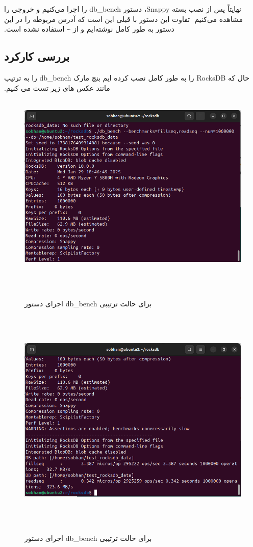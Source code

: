 ‫
‫نهایتاً پس از نصب بسته Snappy، دستور db\_bench را اجرا می‌کنیم و خروجی را مشاهده می‌کنیم
‫
‫تفاوت این دستور با قبلی این است که آدرس مربوطه را در این دستور به طور کامل نوشته‌ایم و از \texttt{\textasciitilde} استفاده نشده است.
‫
‫‫\subsection*{بررسی کارکرد}
‫حال که RocksDB را به طور کامل نصب کرده ایم بنچ مارک db\_bench را به ترتیب مانند عکس های زیر تست می کنیم.
‫\begin{figure}[H]
‫    \centering
‫    \includegraphics[width=\textwidth]{figs/6.png}
‫    \caption{اجرای دستور db\_bench برای حالت ترتیبی}
‫\end{figure}
‫
‫\begin{figure}[H]
‫    \centering
‫    \includegraphics[width=\textwidth]{figs/7.png}
‫    \caption{اجرای دستور db\_bench برای حالت ترتیبی}
‫\end{figure}
